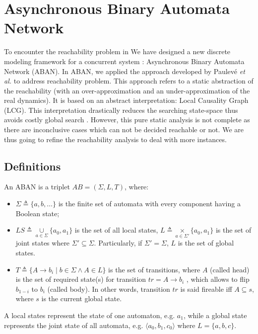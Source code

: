 \section{Asynchronous Binary Automata Network}
To encounter the reachability problem in We have designed a new discrete modeling framework for a concurrent system \cite{chai2018heuristic}: Asynchronous Binary Automata Network (ABAN).
In ABAN, we applied the approach developed by Paulev\'e \textit{et al.} \cite{pauleve2017reduction,folschette2015,pauleve2011} to address reachability problem.
This approach refers to a static abstraction of the reachability (with an over-approximation and an under-approximation of the real dynamics).
It is based on an abstract interpretation: Local Causality Graph (LCG). 
This interpretation drastically reduces the searching state-space thus avoids costly global search \cite{pauleve2012}. 
However, this pure static analysis is not complete as there are inconclusive cases which can not be decided reachable or not.
We are thus going to refine the reachability analysis to deal with more instances.
\subsection{Definitions}
\begin{definition}[ABAN]
An ABAN is a triplet $AB = (\Sigma,L,T)$, where:
\begin{itemize}
\item $\Sigma\triangleq\{a,b,\ldots\}$ is the finite set of automata with every component having a Boolean state;
\item $LS\triangleq \underset{a\in \Sigma}{\cup} \{a_0,a_1\}$ is the set of all local states, $L\triangleq \underset{a\in \Sigma'}{\times} \{a_0,a_1\}$ is the set of joint states where $\Sigma'\subseteq\Sigma$. Particularly, if $\Sigma'=\Sigma$, $L$ is the set of global states. 
\item $T\triangleq \{A\rightarrow b_i\mid b\in \Sigma \land A\in L\}$ is the set of transitions, where $A$ (called head) is the set of required state(s) for transition $tr=A\to b_i$ , which allows to flip $b_{1-i}$ to $b_i$ (called body). In other words, transition $tr$ is said fireable iff $A\subseteq s$, where $s$ is the current global state.
\end{itemize}
\end{definition}

A local states represent the state of one automaton, e.g. $a_1$, while a global state represents the joint state of all automata, e.g. $\langle a_0, b_1,c_0 \rangle$ where $L=\{a,b,c\}$.

